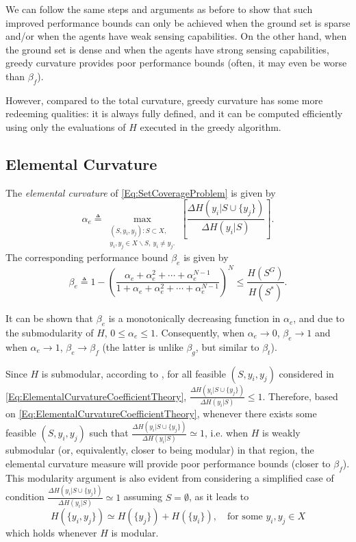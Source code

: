 \documentclass[letterpaper, 10 pt, conference]{ieeeconf}
\begin{document}
We can follow the same steps and arguments as before to show that such improved performance bounds can only be achieved when the ground set is sparse and/or when the agents have weak sensing capabilities. On the other hand, when the ground set is dense and when the agents have strong sensing capabilities, greedy curvature provides poor performance bounds (often, it may even be worse than $\beta_f$). 

However, compared to the total curvature, greedy curvature has some more redeeming qualities: it is always fully defined, and it can be computed efficiently using only the evaluations of $H$ executed in the greedy algorithm.





\subsection{Elemental Curvature \cite{Wang2016}}\label{SubSec:ElementalCurvature}

The \emph{elemental curvature} of \eqref{Eq:SetCoverageProblem} is given by 
\begin{equation}\label{Eq:ElementalCurvatureCoefficientTheory}
    \alpha_e \triangleq \max_{\substack{(S,y_i,y_j): S \subset X,\\ y_i,y_j \in X \backslash S,\ y_i \neq y_j.}}\left[\frac{\Delta H(y_i \vert S \cup \{y_j\})}{\Delta H(y_i \vert S)}\right].
\end{equation}
The corresponding performance bound $\beta_e$ is given by 
\begin{equation}\label{Eq:ElementalCurvatureBoundTheory}
    \beta_e \triangleq 1-\left(\frac{\alpha_e + \alpha_e^2 + \cdots + \alpha_e^{N-1}}{1 + \alpha_e + \alpha_e^2 + \cdots + \alpha_e^{N-1}}\right)^N \leq \frac{H(S^G)}{H(S^*)}.
\end{equation}

It can be shown that $\beta_e$ is a monotonically decreasing function in $\alpha_e$, and due to the submodularity of $H$, $0 \leq \alpha_e \leq 1$. Consequently, when $\alpha_e \rightarrow 0$, $\beta_e \rightarrow 1$ and when $\alpha_e \rightarrow 1$, $\beta_e \rightarrow \beta_f$ (the latter is unlike $\beta_g$, but similar to $\beta_t$).

Since $H$ is submodular, according to  \cite[Prop. 2.1]{Nemhauser1978}, for all feasible $(S,y_i,y_j)$ considered in \eqref{Eq:ElementalCurvatureCoefficientTheory}, $\frac{\Delta H(y_i \vert S \cup \{y_j\})}{\Delta H(y_i \vert S)} \leq 1$. Therefore, based on \eqref{Eq:ElementalCurvatureCoefficientTheory}, whenever there exists some feasible $(S,y_i,y_j)$ such that  $\frac{\Delta H(y_i \vert S \cup \{y_j\})}{\Delta H(y_i \vert S)} \simeq 1$, i.e. when $H$ is weakly submodular (or, equivalently, closer to being modular) in that region, the elemental curvature measure will provide poor performance bounds (closer to $\beta_f$). This modularity argument is also evident from considering a simplified case of condition $\frac{\Delta H(y_i \vert S \cup \{y_j\})}{\Delta H(y_i \vert S)} \simeq 1$ assuming $S=\emptyset$, as it leads to
$$
H(\{y_i,y_j\}) \simeq H(\{y_j\}) + H(\{y_i\}), \quad \mbox{for some } y_i,y_j\in X
$$
which holds whenever $H$ is modular.
\end{document}
